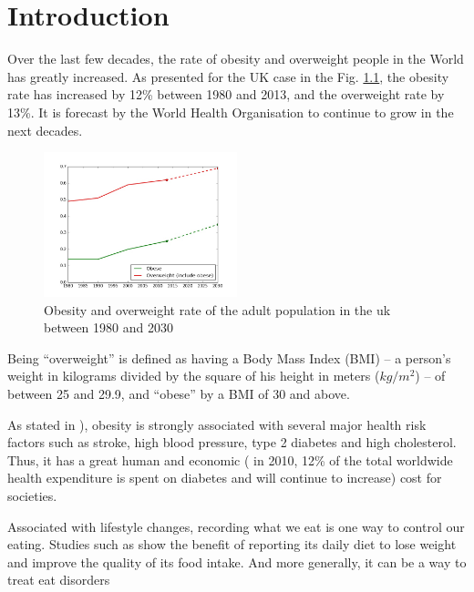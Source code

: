 \chapter{Introduction}

Over the last few decades, the rate of obesity and overweight people in the World has greatly increased. As presented for the UK case in the Fig. \ref{fig:obesity_uk}, the obesity rate has increased by 12\% between 1980 and 2013, and the overweight rate by 13\%. It is forecast by the World Health Organisation to continue to grow in the next decades.

\begin{figure}[h]
    \centering
    \includegraphics[width=0.5\textwidth,  height=0.455\textwidth ]{img/obesity_uk.jpg}
    \caption[Obesity and overweight rate of the adult population in the uk between 1980 and 2030. \textit{Source: World Health Organisation}]{Obesity and overweight rate of the adult population in the uk between 1980 and 2030}
    \label{fig:obesity_uk}
\end{figure}

Being \enquote{overweight} is defined as having a Body Mass Index (BMI) – a person's weight in kilograms divided by the square of his height in meters ($ kg / m^2 $) – of between 25 and 29.9, and \enquote{obese} by a BMI of 30 and above.

As stated in \cite{Mokdad2003}), obesity is strongly associated with several major health risk factors such as stroke, high blood pressure, type 2 diabetes and high cholesterol. Thus, it has a great human and economic (\cite{Zhang2010} in 2010, 12\% of the total worldwide health expenditure is spent on diabetes and will continue to increase) cost for societies.

Associated with lifestyle changes, recording what we eat is one way to control our eating. Studies such as \cite{Burke2011a} show the benefit of reporting its daily diet to lose weight and improve the quality of its food intake. And more generally, it can be a way to treat eat disorders

